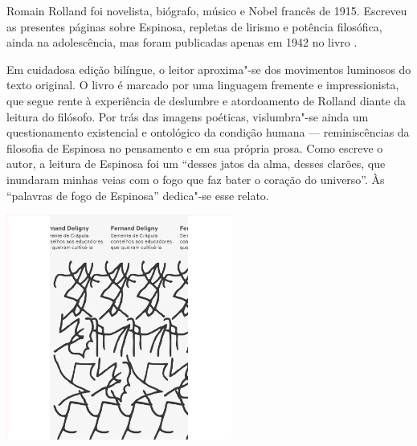 \hspace*{-7cm}\hrulefill\hspace*{-7cm}

\medskip

\noindent{}Romain Rolland foi novelista, biógrafo, músico e Nobel francês de 1915. Escreveu as presentes páginas sobre Espinosa, repletas de lirismo e potência filosófica, ainda na adolescência, mas foram publicadas apenas em 1942 no livro {}. 

Em cuidadosa edição bilíngue, o leitor aproxima"-se dos movimentos luminosos do texto original. O livro é marcado por uma linguagem fremente e impressionista, que segue rente à experiência de deslumbre e atordoamento de Rolland diante da leitura do filósofo. Por trás das imagens poéticas, vislumbra"-se ainda um questionamento existencial e ontológico da condição humana --- reminiscências da filosofia de Espinosa no pensamento e em sua própria prosa. Como escreve o autor, a leitura de Espinosa foi um “desses jatos da alma, desses clarões, que inundaram minhas veias com o fogo que faz bater o coração do universo”. Às “palavras de fogo de Espinosa” dedica"-se esse relato.

\vfill

\hspace*{-.4cm}\begin{minipage}[c]{.5\linewidth}
\small{
{}}
\end{minipage}

\pagebreak

\begin{center}
\hspace*{.5cm}\includegraphics[width=74mm]{./grid/deligny.png}
\end{center}

